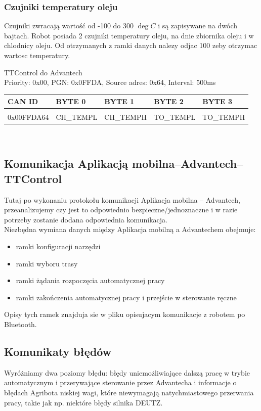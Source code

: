 \documentclass{article}
\begin{document}
\subsubsection{Czujniki temperatury oleju}
Czujniki zwracają wartość od -100 do 300 $\deg C$ i są zapisywane na dwóch bajtach. Robot posiada 2 czujniki temperatury oleju, na dnie zbiornika oleju i w chlodnicy oleju. Od otrzymanych z ramki danych nalezy odjac 100 zeby otrzymac wartosc temperatury.

TTControl do Advantech\\
Priority: 0x00, PGN: 0x0FFDA, Source adres: 0x64, Interval: 500ms\\
\begin{left}
\begin{tabular}{ |p{2cm}|p{1.9cm}|p{1.9cm}|p{1.9cm}|p{1.9cm}|} 
 \hline
 CAN ID & BYTE 0 & BYTE 1 & BYTE 2 & BYTE 3 \\ \hline
 & & & & \\
0x00FFDA64 & CH\_TEMPL & CH\_TEMPH & TO\_TEMPL & TO\_TEMPH \\ 
 \hline
\end{tabular}
\end{left}\\

\subsection{Komunikacja Aplikacją mobilna--Advantech--TTControl}

Tutaj po wykonaniu protokołu komunikacji Aplikacja mobilna -- Advantech, przeanalizujemy czy jest to odpowiednio bezpieczne/jednoznaczne i w razie potrzeby zostanie dodana odpowiednia komunikacja.\\
Niezbędna wymiana danych między Aplikacja mobilną a Advantechem obejmuje:
\begin{itemize}
\item ramki konfiguracji narzędzi
\item ramki wyboru trasy
\item ramki żądania rozpoczęcia automatycznej pracy 
\item ramki zakończenia automatycznej pracy i przejście w sterowanie ręczne
\end{itemize}

Opisy tych ramek znajduja sie w pliku opisujacym komunikacje z robotem po Bluetooth.

\subsection{Komunikaty błędów}
Wyróżniamy dwa poziomy błędu: błędy uniemożliwiające dalszą pracę w trybie automatycznym i przerywające sterowanie przez Advantecha i informacje o błędach Agribota niskiej wagi, które niewymagają natychmiastowego przerwania pracy, takie jak np. niektóre błędy silnika DEUTZ. 
\end{document}
